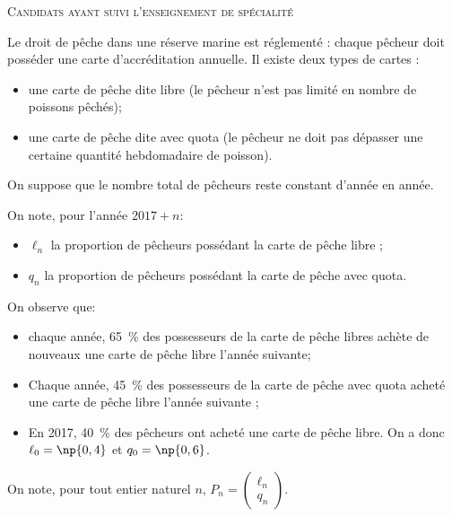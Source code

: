 \documentclass[10pt,a4paper]{article}
\begin{document}
\smallskip

\textsc{Candidats ayant  suivi l'enseignement de spécialité}

\bigskip

Le droit de pêche dans une réserve marine est réglementé : chaque pêcheur doit posséder une carte d'accréditation annuelle. Il existe deux types de cartes :

\begin{itemize}
\item une carte de pêche dite \og libre \fg{} (le pêcheur n'est pas limité en nombre de poissons pêchés);
\item une carte de pêche dite \og avec quota \fg{} (le pêcheur ne doit pas dépasser une certaine quantité hebdomadaire de poisson).
\end{itemize}

\smallskip

On suppose que le nombre total de pêcheurs reste constant d'année en année.

On note, pour l'année $2017+n$:
\begin{itemize}
\item $\ell_n$ la proportion de pêcheurs possédant la carte de pêche libre ;
\item $q_n$ la proportion de pêcheurs possédant la carte de pêche avec quota.
\end{itemize}

On observe que:
\begin{itemize}
\item chaque année, 65~\% des possesseurs de la carte de pêche libres achète de nouveaux une carte de pêche libre l'année suivante;
\item Chaque année, 45~\% des possesseurs de la carte de pêche avec quota acheté une carte de pêche libre l'année suivante ;
\item En 2017, 40~\% des pêcheurs ont acheté une carte de pêche libre. On a donc $\ell_0=\np{0,4}$ et $q_0=\np{0,6}$.
\end{itemize}

On note, pour tout entier naturel $n$, $P_n=\begin{pmatrix}
\ell_n\\q_n
\end{pmatrix}$.

\medskip
\end{document}
